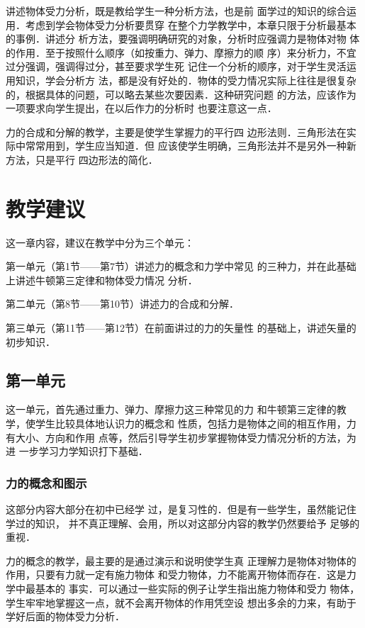 讲述物体受力分析，既是教给学生一种分析方法，也是前
面学过的知识的综合运用．考虑到学会物体受力分析要贯穿
在整个力学教学中，本章只限于分析最基本的事例．讲述分
析方法，要强调明确研究的对象，分析时应强调力是物体对物
体的作用．至于按照什么顺序（如按重力、弹力、摩擦力的顺
序）来分析力，不宜过分强调，强调得过分，甚至要求学生死
记住一个分析的顺序，对于学生灵活运用知识，学会分析方
法，都是没有好处的．物体的受力情况实际上往往是很复杂
的，根据具体的问题，可以略去某些次要因素．这种研究问题
的方法，应该作为一项要求向学生提出，在以后作力的分析时
也要注意这一点．

力的合成和分解的教学，主要是使学生掌握力的平行四
边形法则．三角形法在实际中常常用到，学生应当知道．但
应该使学生明确，三角形法并不是另外一种新方法，只是平行
四边形法的简化．


\section{教学建议}
这一章内容，建议在教学中分为三个单元：

第一单元（第1节——第7节）讲述力的概念和力学中常见
的三种力，并在此基础上讲述牛顿第三定律和物体受力情况
分析．

第二单元（第8节——第10节）讲述力的合成和分解．

第三单元（第11节——第12节）在前面讲过的力的矢量性
的基础上，讲述矢量的初步知识．

\subsection{第一单元}
这一单元，首先通过重力、弹力、摩擦力这三种常见的力
和牛顿第三定律的教学，使学生比较具体地认识力的概念和
性质，包括力是物体之间的相互作用，力有大小、方向和作用
点等，然后引导学生初步掌握物体受力情况分析的方法，为进
一步学习力学知识打下基础．

\subsubsection{力的概念和图示}

这部分内容大部分在初中已经学
过，是复习性的．但是有一些学生，虽然能记住学过的知识，
并不真正理解、会用，所以对这部分内容的教学仍然要给予
足够的重视．

力的概念的教学，最主要的是通过演示和说明使学生真
正理解力是物体对物体的作用，只要有力就一定有施力物体
和受力物体，力不能离开物体而存在．这是力学中最基本的
事实．可以通过一些实际的例子让学生指出施力物体和受力
物体，学生牢牢地掌握这一点，就不会离开物体的作用凭空设
想出多余的力来，有助于学好后面的物体受力分析．


